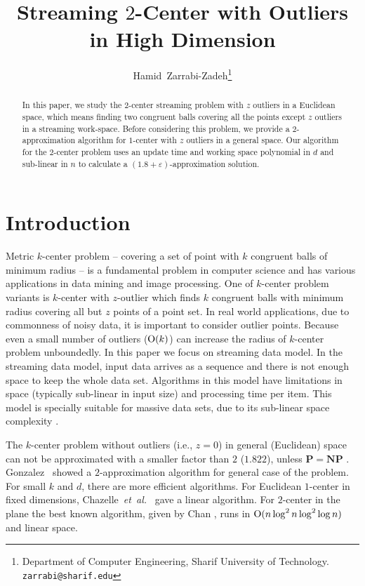 \documentclass[envcountsame]{cls/cccg15}
\title{Streaming $2$-Center with Outliers in High Dimension}
\author{Hamid~Zarrabi-Zadeh\thanks{Department of Computer Engineering, 
	Sharif University of Technology.
	{\tt zarrabi@sharif.edu}}
	\and 
}
\newcommand{\cO}{\ensuremath{{\rm O}}}
\newcommand{\eps}{\varepsilon}
\newcommand{\etal}{{\em et~al.\/}}
\begin{document}
\maketitle
\pagestyle{plain}


\begin{abstract}
In this paper, we study the $2$-center streaming problem with $z$ outliers in a Euclidean space, which means finding two congruent balls covering all the points except $z$ outliers in a streaming work-space. Before considering this problem, we provide a  $2$-approximation algorithm for $1$-center with $z$ outliers in a general space. Our algorithm for the $2$-center problem uses an update time and working space polynomial in $d$ and sub-linear in $n$ to calculate a $(1.8+\eps)$-approximation solution.
\end{abstract}


\section{Introduction}
Metric $k$-center problem -- covering a set of point with $k$ congruent balls of minimum radius -- is a fundamental problem in computer science and has various applications in data mining and image processing.
One of $k$\nobreakdash-center problem variants is $k$-center with $z$-outlier which finds $k$ congruent balls with minimum radius covering all but $z$ points of a point set. In real world applications, due to commonness of noisy data, it is important to consider outlier points. Because even a small number of outliers ($\cO(k)$) can increase the radius of $k$\nobreakdash-center problem unboundedly.
In this paper we focus on streaming data model. In the streaming data model, input data arrives as a sequence and there is not enough space to keep the whole data set. Algorithms in this model have limitations in space (typically sub-linear in input size) and processing time per item. This model is specially suitable for massive data sets, due to its sub-linear space complexity \cite{aggarwal2007data}.

The $k$-center problem without outliers (i.e., $z=0$) in general (Euclidean) space can not be approximated with a smaller factor than $2$ ($1.822$), unless $\mathbf{P}=\mathbf{NP}$ \cite{bern1996approximation}.
Gonzalez~\cite{gonzalez1985clustering} showed a $2$-approximation algorithm for general case of the problem.
For small $k$ and $d$, there are more efficient algorithms.
For Euclidean $1$-center in fixed dimensions, Chazelle~\etal~\cite{chazelle1996linear} gave a linear algorithm.
For $2$\nobreakdash-center in the plane the best known algorithm, given by Chan \cite{chan1999more}, runs in $\cO(n \log^2 n \log^2 \log n)$ and linear space.
\end{document}
